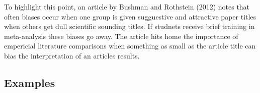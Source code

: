 \documentclass[12pt]{article}\usepackage[]{graphicx}\usepackage[]{color}
\begin{document}
\begin{flushleft}
To highlight this point, an article by Bushman and Rothstein (2012) notes that often biases occur when one group is given sugguestive and attractive paper titles when others get dull scientific sounding titles. If studnets receive brief training in meta-analysis these biases go away. The article hits home the importance of empericial literature comparisons when something as small as the article title can bias the interpretation of an articles results.

\subsection{Examples}


\clearpage
{}


\begingroup
	\nocite{*}



	

	

\endgroup


%
%




\clearpage
{}
\printindex











\end{flushleft}
\end{document}
